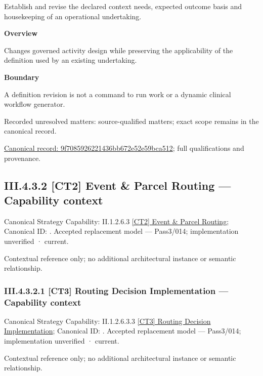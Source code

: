 Establish and revise the declared context needs, expected outcome basis and housekeeping of an operational undertaking.



\textbf{Overview}



Changes governed activity design while preserving the applicability of the definition used by an existing undertaking.



\textbf{Boundary}



A definition revision is not a command to run work or a dynamic clinical workflow generator.


{\small Recorded unresolved matters: source-qualified matters; exact scope remains in the canonical record.}\par
{\footnotesize \href{../../../../continuum/business/business-function/9f7085926221436bb672e52e59bca512.md}{Canonical record: 9f7085926221436bb672e52e59bca512}; full qualifications and provenance.}\par
\subsection*{III.4.3.2 [CT2] Event \& Parcel Routing — Capability context}
\label{navigation:III.4.3.2}

{\small Canonical Strategy Capability: II.1.2.6.3 \hyperref[element:3651fa9017f84b81a8a12b7a9a6c01a4]{[CT2] Event \& Parcel Routing}; Canonical ID: \texttt{}. Accepted replacement model — Pass3/014; implementation unverified · current.}\par
Contextual reference only; no additional architectural instance or semantic relationship.\par
\subsubsection*{III.4.3.2.1 [CT3] Routing Decision Implementation — Capability context}
\label{navigation:III.4.3.2.1}

{\small Canonical Strategy Capability: II.1.2.6.3.3 \hyperref[element:2272dc936e6a4243a12049cd007df5d5]{[CT3] Routing Decision Implementation}; Canonical ID: \texttt{}. Accepted replacement model — Pass3/014; implementation unverified · current.}\par
Contextual reference only; no additional architectural instance or semantic relationship.\par

